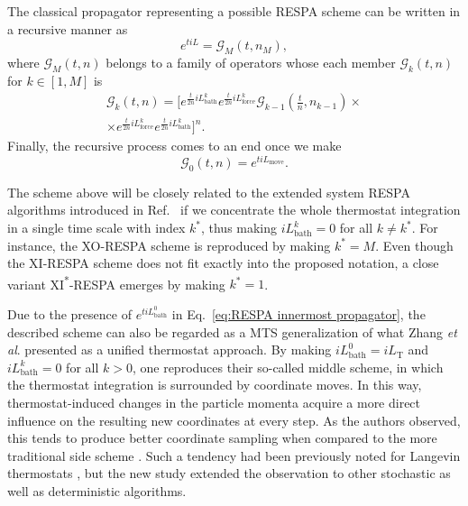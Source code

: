 \documentclass[
    journal=jctcce,
    layout=twocolumn
]{achemso}
\newcommand{\Liu}{i\!L}
\begin{document}
The classical propagator representing a possible RESPA scheme can be written in a recursive manner as
\begin{equation}
\label{eq:RESPA outermost propagator}
e^{t \Liu} = \mathcal{G}_M(t,n_M),
\end{equation}
where $\mathcal{G}_M(t,n)$ belongs to a family of operators whose each member $\mathcal{G}_k(t,n)$ for $k \in [1, M]$ is
\begin{multline}
\label{eq:RESPA scheme 1}
\mathcal{G}_k(t,n) = \Big[e^{\frac{t}{2 n} \Liu_\mathrm{bath}^k}
e^{\frac{t}{2 n} \Liu_\mathrm{force}^k}
\mathcal{G}_{k-1}\left(\tfrac{t}{n}, n_{k-1}\right) \times \\
\times e^{\frac{t}{2 n} \Liu_\mathrm{force}^k}
e^{\frac{t}{2 n} \Liu_\mathrm{bath}^k}
\Big]^{n}.
\end{multline}
Finally, the recursive process comes to an end once we make
\begin{equation}
\label{eq:RESPA innermost propagator}
\mathcal{G}_0(t,n) = e^{t \Liu_\mathrm{move}}.
\end{equation}

The scheme above will be closely related to the extended system RESPA algorithms introduced in Ref.~ if we concentrate the whole thermostat integration in a single time scale with index $k^\ast$, thus making $\Liu_\mathrm{bath}^k = 0$ for all $k \neq k^\ast$.
For instance, the XO-RESPA scheme \cite{Martyna_1996, Leimkuhler_2013} is reproduced by making $k^\ast = M$.
Even though the XI-RESPA scheme \cite{Martyna_1996, Leimkuhler_2013} does not fit exactly into the proposed notation, a close variant XI\textsuperscript{*}-RESPA emerges by making $k^\ast = 1$.

Due to the presence of $e^{t \Liu_\mathrm{bath}^0}$ in Eq.~\eqref{eq:RESPA innermost propagator}, the described scheme can also be regarded as a MTS generalization of what Zhang \textit{et al}. \cite{Zhang_2017} presented as a unified thermostat approach.
By making $\Liu_\mathrm{bath}^0 = \Liu_\mathrm{T}$ and $\Liu_\mathrm{bath}^k = 0$ for all $k > 0$, one reproduces their so-called middle scheme, in which the thermostat integration is surrounded by coordinate moves.
In this way, thermostat-induced changes in the particle momenta acquire a more direct influence on the resulting new coordinates at every step.
As the authors observed, this tends to produce better coordinate sampling when compared to the more traditional side scheme \cite{Zhang_2017}.
Such a tendency had been previously noted for Langevin thermostats \cite{Leimkuhler_2012, Leimkuhler_2013_2}, but the new study extended the observation to other stochastic as well as deterministic algorithms.
\end{document}
